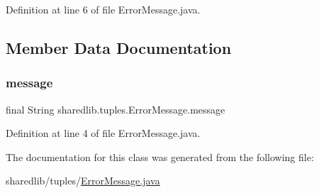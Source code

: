 Definition at line 6 of file Error\+Message.\+java.



\subsection{Member Data Documentation}
\hypertarget{classsharedlib_1_1tuples_1_1_error_message_a26c9d43f1a3be733cfebcc55c735b6ed}{}\label{classsharedlib_1_1tuples_1_1_error_message_a26c9d43f1a3be733cfebcc55c735b6ed} 
\subsubsection{\texorpdfstring{message}{message}}
{\footnotesize\ttfamily final String sharedlib.\+tuples.\+Error\+Message.\+message}



Definition at line 4 of file Error\+Message.\+java.



The documentation for this class was generated from the following file\+:\begin{DoxyCompactItemize}
\item 
sharedlib/tuples/\hyperlink{_error_message_8java}{Error\+Message.\+java}\end{DoxyCompactItemize}
